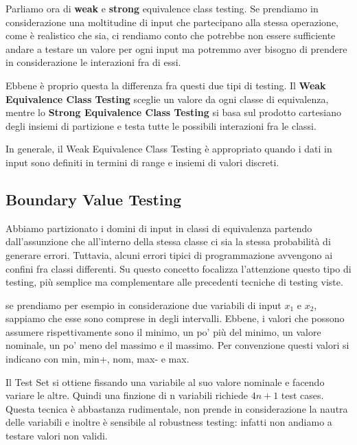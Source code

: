             \vspace{1mm}
            Parliamo ora di \textbf{weak} e \textbf{strong} equivalence class testing. Se prendiamo in considerazione una moltitudine di input che partecipano alla stessa operazione, come è realistico che sia, ci rendiamo conto che potrebbe non essere sufficiente andare a testare un valore per ogni input ma potremmo aver bisogno di prendere in considerazione le interazioni fra di essi.
            
            Ebbene è proprio questa la differenza fra questi due tipi di testing. Il \textbf{Weak Equivalence Class Testing} sceglie un valore da ogni classe di equivalenza, mentre lo \textbf{Strong Equivalence Class Testing} si basa sul prodotto cartesiano degli insiemi di partizione e testa tutte le possibili interazioni fra le classi.
            
            In generale, il Weak Equivalence Class Testing è appropriato quando i dati in input sono definiti in termini di range e insiemi di valori discreti.
            
        \subsection{Boundary Value Testing}
            Abbiamo partizionato i domini di input in classi di equivalenza partendo dall'assunzione che all'interno della stessa classe ci sia la stessa probabilità di generare errori. Tuttavia, alcuni errori tipici di programmazione avvengono ai confini fra classi differenti. Su questo concetto focalizza l'attenzione questo tipo di testing, più semplice ma complementare alle precedenti tecniche di testing viste.
            
            se prendiamo per esempio in considerazione due variabili di input $x_1$ e $x_2$, sappiamo che esse sono comprese in degli intervalli. Ebbene, i valori che possono assumere rispettivamente sono il minimo, un po' più del minimo, un valore nominale, un po' meno del massimo e il massimo. Per convenzione questi valori si indicano con min, min+, nom, max- e max.
            
            Il Test Set si ottiene fissando una variabile al suo valore nominale e facendo variare le altre. Quindi una finzione di n variabili richiede $4n + 1$ test cases. Questa tecnica è abbastanza rudimentale, non prende in considerazione la nautra delle variabili e inoltre è sensibile al robustness testing: infatti non andiamo a testare valori non validi.
            
